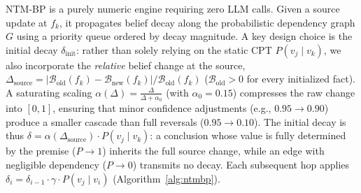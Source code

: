 \documentclass{article}
\theoremstyle{definition}
\begin{document}
NTM-BP is a purely numeric engine requiring zero LLM calls.  Given a
source update at $f_k$, it propagates belief decay along the
probabilistic dependency graph $G$ using a priority queue ordered by
decay magnitude.  A key design choice is the initial decay
$\delta_{\text{init}}$: rather than solely relying on the static CPT
$P(v_j\mid v_k)$, we also incorporate the \emph{relative} belief change
at the source,
$\Delta_{\text{source}} = |\mathcal{B}_{\text{old}}(f_k) -
\mathcal{B}_{\text{new}}(f_k)| / \mathcal{B}_{\text{old}}(f_k)$
($\mathcal{B}_{\text{old}}>0$ for every initialized fact).  A saturating
scaling $\alpha(\Delta) = \frac{\Delta}{\Delta + \alpha_0}$ (with
$\alpha_0=0.15$) compresses the raw change into $[0,1]$, ensuring that
minor confidence adjustments (e.g., $0.95\to 0.90$) produce a smaller
cascade than full reversals ($0.95\to 0.10$).  The initial decay is
thus $\delta = \alpha(\Delta_{\text{source}})\cdot P(v_j\mid v_k)$: a
conclusion whose value is fully determined by the premise ($P\to1$)
inherits the full source change, while an edge with negligible
dependency ($P\to0$) transmits no decay.  Each subsequent hop applies
$\delta_{i} = \delta_{i-1}\cdot\gamma\cdot P(v_j\mid v_i)$
(Algorithm~\ref{alg:ntmbp}).
\end{document}
